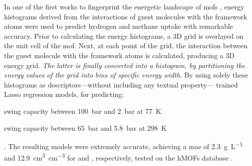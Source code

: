 In one of the first works to fingerprint the energetic landscape of \glspl{mof}
\parencite{bucior}, energy histograms derived from the
interactions of guest molecules with the framework atoms were used to predict
hydrogen and methane uptake with remarkable accuracy. Prior to calculating the
energy histograms, a 3D grid is overlayed on the unit cell of
the \gls{mof}. Next, at each point of the grid, the interaction between the
guest molecule with the framework atoms is calculated, producing a 3D energy
grid. \emph{The latter is finally converted into a histogram, by
partitioning the energy values of the grid into bins of specific energy width}.
By using solely these histograms as descriptors---without including any textual
property---\textcite{bucior} trained Lasso regression
models, for predicting:
\begin{enumerate*}
	\item {} swing capacity between \SI{100}{\bar}
		and \SI{2}{\bar} at \SI{77}{\kelvin}
	\item {} swing capacity between \SI{65}{\bar}
		and \SI{5.8}{\bar} at \SI{298}{\kelvin}
\end{enumerate*}.
The resulting models were extremely accurate, achieving a \gls{mae} of \SI{2.3}{\gram\per\liter} and
\SI{12.9}{\cubic\centi\meter\per\cubic\centi\meter} for  and ,
respectively, tested on the hMOFs database
\parencite{siegel36}.

